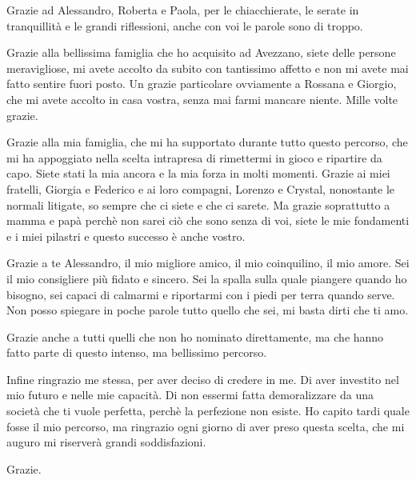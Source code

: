 Grazie ad Alessandro, Roberta e Paola, per le chiacchierate, le serate in tranquillità e le grandi riflessioni, anche con voi le parole sono di troppo.

Grazie alla bellissima famiglia che ho acquisito ad Avezzano, siete delle persone meravigliose, mi avete accolto da subito con tantissimo affetto e non mi avete mai fatto sentire fuori posto. Un grazie particolare ovviamente a Rossana e Giorgio, che mi avete accolto in casa vostra, senza mai farmi mancare niente. Mille volte grazie.

Grazie alla mia famiglia, che mi ha supportato durante tutto questo percorso, che mi ha appoggiato nella scelta intrapresa di rimettermi in gioco e ripartire da capo. Siete stati la mia ancora e la mia forza in molti momenti. Grazie ai miei fratelli, Giorgia e Federico e ai loro compagni, Lorenzo e Crystal, nonostante le normali litigate, so sempre che ci siete e che ci sarete. Ma grazie soprattutto a mamma e papà perchè non sarei ciò che sono senza di voi, siete le mie fondamenti e i miei pilastri e questo successo è anche vostro. 

Grazie a te Alessandro, il mio migliore amico, il mio coinquilino, il mio amore. Sei il mio consigliere più fidato e sincero. Sei la spalla sulla quale piangere quando ho bisogno, sei capaci di calmarmi e riportarmi con i piedi per terra quando serve. Non posso spiegare in poche parole tutto quello che sei, mi basta dirti che ti amo.

Grazie anche a tutti quelli che non ho nominato direttamente, ma che hanno fatto parte di questo intenso, ma bellissimo percorso. 

Infine ringrazio me stessa, per aver deciso di credere in me. Di aver investito nel mio futuro e nelle mie capacità. Di non essermi fatta demoralizzare da una società che ti vuole perfetta, perchè la perfezione non esiste. Ho capito tardi quale fosse il mio percorso, ma ringrazio ogni giorno di aver preso questa scelta, che mi auguro mi riserverà grandi soddisfazioni. 

Grazie. 



